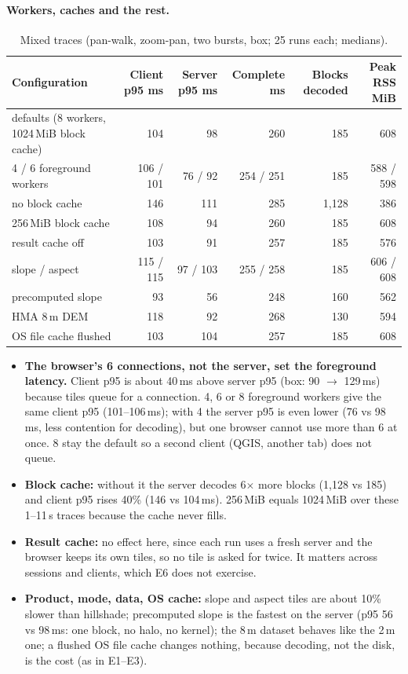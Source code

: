 ﻿\documentclass[11pt,a4paper]{article}
\begin{document}
\paragraph{Workers, caches and the rest.}
\begin{table}[H]
\centering\small
\caption{Mixed traces (pan-walk, zoom-pan, two bursts, box; 25 runs each; medians).}
\label{tab:e6mixed}
\begin{tabularx}{\linewidth}{lRRRRR}
\toprule
Configuration & Client p95 ms & Server p95 ms & Complete ms & Blocks decoded & Peak RSS MiB \\
\midrule
defaults (8 workers, 1024\,MiB block cache) & 104 & 98 & 260 & 185 & 608 \\
4 / 6 foreground workers & 106 / 101 & 76 / 92 & 254 / 251 & 185 & 588 / 598 \\
no block cache & 146 & 111 & 285 & 1{,}128 & 386 \\
256\,MiB block cache & 108 & 94 & 260 & 185 & 608 \\
result cache off & 103 & 91 & 257 & 185 & 576 \\
slope / aspect & 115 / 115 & 97 / 103 & 255 / 258 & 185 & 606 / 608 \\
precomputed slope & 93 & 56 & 248 & 160 & 562 \\
HMA 8\,m DEM & 118 & 92 & 268 & 130 & 594 \\
OS file cache flushed & 103 & 104 & 257 & 185 & 608 \\
\bottomrule
\end{tabularx}
\end{table}
\begin{itemize}
  \item \textbf{The browser's 6 connections, not the server, set the foreground latency.} Client p95 is about 40\,ms
  above server p95 (box: 90 $\to$ 129\,ms) because tiles queue for a connection. 4, 6 or 8 foreground workers give the
  same client p95 (101--106\,ms); with 4 the server p95 is even lower (76 vs 98\,ms, less contention for decoding), but
  one browser cannot use more than 6 at once. 8 stay the default so a second client (QGIS, another tab) does not queue.
  \item \textbf{Block cache:} without it the server decodes 6$\times$ more blocks (1{,}128 vs 185) and client p95 rises
  40\% (146 vs 104\,ms). 256\,MiB equals 1024\,MiB over these 1--11\,s traces because the cache never fills.
  \item \textbf{Result cache:} no effect here, since each run uses a fresh server and the browser keeps its own tiles, so
  no tile is asked for twice. It matters across sessions and clients, which E6 does not exercise.
  \item \textbf{Product, mode, data, OS cache:} slope and aspect tiles are about 10\% slower than hillshade; precomputed
  slope is the fastest on the server (p95 56 vs 98\,ms: one block, no halo, no kernel); the 8\,m dataset behaves like
  the 2\,m one; a flushed OS file cache changes nothing, because decoding, not the disk, is the cost (as in E1--E3).
\end{itemize}
\end{document}
